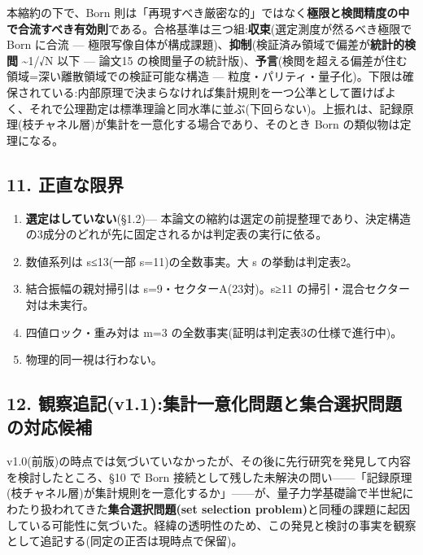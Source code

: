 \documentclass[
]{ltjsarticle}
\providecommand{\tightlist}{%
  \setlength{\itemsep}{0pt}\setlength{\parskip}{0pt}}
\begin{document}
本縮約の下で、Born
則は「再現すべき厳密な的」ではなく\textbf{極限と検閲精度の中で合流すべき有効則}である。合格基準は三つ組:\textbf{収束}(選定測度が然るべき極限で
Born に合流 ---
極限写像自体が構成課題)、\textbf{抑制}(検証済み領域で偏差が\textbf{統計的検閲}
\textasciitilde1/√N 以下 --- 論文15
の検閲量子の統計版)、\textbf{予言}(検閲を超える偏差が住む領域=深い離散領域での検証可能な構造
---
粒度・パリティ・量子化)。下限は確保されている:内部原理で決まらなければ集計規則を一つ公準として置けばよく、それで公理勘定は標準理論と同水準に並ぶ(下回らない)。上振れは、記録原理(枝チャネル層)が集計を一意化する場合であり、そのとき
Born の類似物は定理になる。

\subsection{11. 正直な限界}\label{ux6b63ux76f4ux306aux9650ux754c}

\begin{enumerate}
\def\labelenumi{\arabic{enumi}.}
\tightlist
\item
  \textbf{選定はしていない}(§1.2)---
  本論文の縮約は選定の前提整理であり、決定構造の3成分のどれが先に固定されるかは判定表の実行に依る。
\item
  数値系列は s≤13(一部 s=11)の全数事実。大 s の挙動は判定表2。
\item
  結合振幅の親対掃引は s=9・セクターA(23対)。s≥11
  の掃引・混合セクター対は未実行。
\item
  四値ロック・重み対は m=3 の全数事実(証明は判定表3の仕様で進行中)。
\item
  物理的同一視は行わない。
\end{enumerate}

\subsection{12.
観察追記(v1.1):集計一意化問題と集合選択問題の対応候補}\label{ux89b3ux5bdfux8ffdux8a18v1.1ux96c6ux8a08ux4e00ux610fux5316ux554fux984cux3068ux96c6ux5408ux9078ux629eux554fux984cux306eux5bfeux5fdcux5019ux88dc}

v1.0(前版)の時点では気づいていなかったが、その後に先行研究を発見して内容を検討したところ、§10
で Born
接続として残した未解決の問い------「記録原理(枝チャネル層)が集計規則を一意化するか」------が、量子力学基礎論で半世紀にわたり扱われてきた\textbf{集合選択問題(set
selection
problem)}と同種の課題に起因している可能性に気づいた。経緯の透明性のため、この発見と検討の事実を観察として追記する(同定の正否は現時点で保留)。
\end{document}
